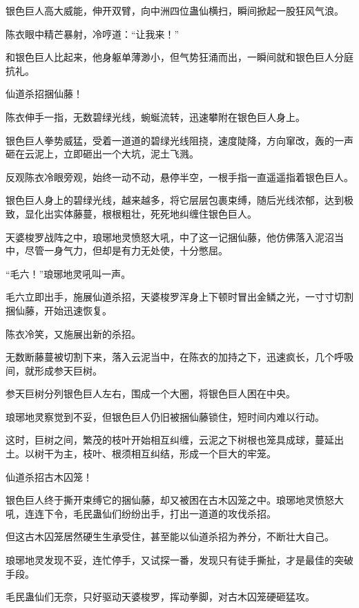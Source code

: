 
\begin{this_body}

银色巨人高大威能，伸开双臂，向中洲四位蛊仙横扫，瞬间掀起一股狂风气浪。

陈衣眼中精芒暴射，冷哼道：“让我来！”

和银色巨人比起来，他身躯单薄渺小，但气势狂涌而出，一瞬间就和银色巨人分庭抗礼。

仙道杀招捆仙藤！

陈衣伸手一指，无数碧绿光线，蜿蜒流转，迅速攀附在银色巨人身上。

银色巨人拳势威猛，受着一道道的碧绿光线阻挠，速度陡降，方向窜改，轰的一声砸在云泥上，立即砸出一个大坑，泥土飞溅。

反观陈衣冷眼旁观，始终一动不动，悬停半空，一根手指一直遥遥指着银色巨人。

银色巨人身上的碧绿光线，越来越多，将它层层包裹束缚，随后光线浓郁，达到极致，显化出实体藤蔓，根根粗壮，死死地纠缠住银色巨人。

天婆梭罗战阵之中，琅琊地灵愤怒大吼，中了这一记捆仙藤，他仿佛落入泥沼当中，尽管一身气力，但却是有力无处使，十分憋屈。

“毛六！”琅琊地灵吼叫一声。

毛六立即出手，施展仙道杀招，天婆梭罗浑身上下顿时冒出金鳞之光，一寸寸切割捆仙藤，开始迅速恢复。

陈衣冷笑，又施展出新的杀招。

无数断藤蔓被切割下来，落入云泥当中，在陈衣的加持之下，迅速疯长，几个呼吸间，就形成参天巨树。

参天巨树分列银色巨人左右，围成一个大圈，将银色巨人困在中央。

琅琊地灵察觉到不妥，但银色巨人仍旧被捆仙藤锁住，短时间内难以行动。

这时，巨树之间，繁茂的枝叶开始相互纠缠，云泥之下树根也笼具成球，蔓延出土。以树干为主，枝叶、根须相互纠结，形成一个巨大的牢笼。

仙道杀招古木囚笼！

银色巨人终于撕开束缚它的捆仙藤，却又被困在古木囚笼之中。琅琊地灵愤怒大吼，连连下令，毛民蛊仙们纷纷出手，打出一道道的攻伐杀招。

但这古木囚笼居然硬生生承受住，甚至能以仙道杀招为养分，不断壮大自己。

琅琊地灵发现不妥，连忙停手，又试探一番，发现只有徒手撕扯，才是最佳的突破手段。

毛民蛊仙们无奈，只好驱动天婆梭罗，挥动拳脚，对古木囚笼硬砸猛攻。


\end{this_body}
